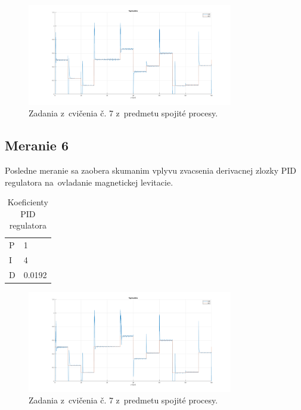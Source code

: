 \documentclass{article}
\begin{document}
\begin{figure}[!htbp]
	\begin{center}
		\includegraphics[width=0.8\textwidth]{./include/m5.png}
	\end{center}
	\caption{Zadania z~cvičenia č. 7 z~predmetu spojité procesy.}
	\label{fig:meranie5}
\end{figure}

\clearpage

\subsection{Meranie 6}
\label{sec:meranie6}


Posledne meranie sa zaobera skumanim vplyvu zvacsenia derivacnej zlozky PID regulatora na~ovladanie magnetickej levitacie.


\begin{table}[!htbp]
	\caption{Koeficienty PID regulatora}
	\label{tab:t6}
	\begin{center}
		\begin{tabular}[c]{|l|l|}
			\hline
			P & 1 \\
			I & 4 \\
			D & 0.0192 \\
			\hline
		\end{tabular}
	\end{center}
\end{table}

\begin{figure}[!htbp]
	\begin{center}
		\includegraphics[width=0.8\textwidth]{./include/m7.png}
	\end{center}
	\caption{Zadania z~cvičenia č. 7 z~predmetu spojité procesy.}
	\label{fig:meranie6}
\end{figure}
\end{document}

